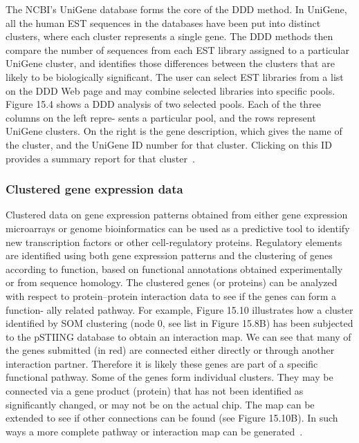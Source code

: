\documentclass{report}
\begin{document}
The NCBI’s UniGene database forms the core of the DDD method. In UniGene, all the human EST sequences in the databases have been put into distinct clusters, where each cluster represents a single gene. The DDD methods then compare the number of sequences from each EST library assigned to a particular UniGene cluster, and identifies those differences between the clusters that are likely to be biologically significant. The user can select EST libraries from a list on the DDD Web page and may combine selected libraries into specific pools. Figure 15.4 shows a DDD analysis of two selected pools. Each of the three columns on the left repre- sents a particular pool, and the rows represent UniGene clusters. On the right is the gene description, which gives the name of the cluster, and the UniGene ID number for that cluster. Clicking on this ID provides a summary report for that cluster~\cite{zvelebil_understanding_2008}.

\subsubsection{Clustered gene expression data}

Clustered data on gene expression patterns obtained from either gene expression microarrays or genome bioinformatics can be used as a predictive tool to identify new transcription factors or other cell-regulatory proteins. Regulatory elements are identified using both gene expression patterns and the clustering of genes according to function, based on functional annotations obtained experimentally or from sequence homology. The clustered genes (or proteins) can be analyzed with respect to protein–protein interaction data to see if the genes can form a function- ally related pathway. For example, Figure 15.10 illustrates how a cluster identified by SOM clustering (node 0, see list in Figure 15.8B) has been subjected to the pSTIING database to obtain an interaction map. We can see that many of the genes submitted (in red) are connected either directly or through another interaction partner. Therefore it is likely these genes are part of a specific functional pathway. Some of the genes form individual clusters. They may be connected via a gene product (protein) that has not been identified as significantly changed, or may not be on the actual chip. The map can be extended to see if other connections can be found (see Figure 15.10B). In such ways a more complete pathway or interaction map can be generated~\cite{zvelebil_understanding_2008}.
\end{document}

